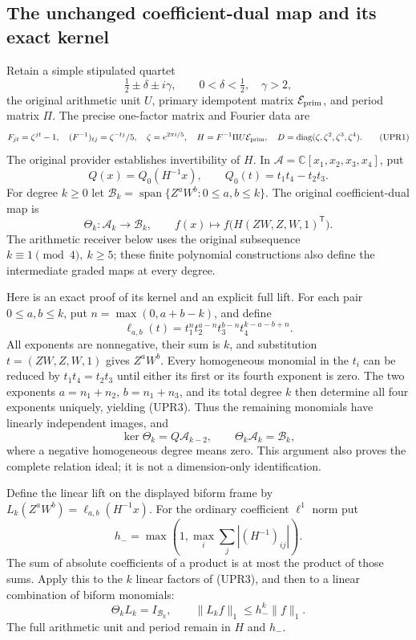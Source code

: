 \subsection{The unchanged coefficient-dual map and its exact kernel}
Retain a simple stipulated quartet
\[
\tfrac12\pm\delta\pm i\gamma,\qquad
0<\delta<\tfrac12,\quad\gamma>2,
\]
the original arithmetic unit \(U\), primary idempotent matrix
\(\mathcal E_{\rm prim}\), and period matrix \(\Pi\).  The precise
one-factor matrix and Fourier data are
\[
F_{jt}=\zeta^{jt}-1,\quad
(F^{-1})_{tj}=\zeta^{-tj}/5,\quad
\zeta=e^{2\pi i/5},\quad
H=F^{-1}\Pi U\mathcal E_{\rm prim},\quad
D=\operatorname{diag}(\zeta,\zeta^2,\zeta^3,\zeta^4).
\tag{UPR1}
\]
The original provider establishes invertibility of \(H\).  In
\(\mathcal A=\mathbb C[x_1,x_2,x_3,x_4]\), put
\[
Q(x)=Q_0(H^{-1}x),\qquad Q_0(t)=t_1t_4-t_2t_3.
\]
For degree \(k\ge0\) let
\(\mathcal B_k=\operatorname{span}\{Z^aW^b:0\le a,b\le k\}\).
The original coefficient-dual map is
\[
\Theta_k:\mathcal A_k\longrightarrow\mathcal B_k,\qquad
f(x)\longmapsto f\bigl(H(ZW,Z,W,1)^{\mathsf T}\bigr).
\tag{UPR2}
\]
The arithmetic receiver below uses the original subsequence
\(k\equiv1\pmod4,\ k\ge5\); these finite polynomial constructions
also define the intermediate graded maps at every degree.

Here is an exact proof of its kernel and an explicit full lift.
For each pair \(0\le a,b\le k\), put \(n=\max(0,a+b-k)\), and define
\[
\ell_{a,b}(t)=
t_1^nt_2^{a-n}t_3^{b-n}t_4^{k-a-b+n}.
\tag{UPR3}
\]
All exponents are nonnegative, their sum is \(k\), and substitution
\(t=(ZW,Z,W,1)\) gives \(Z^aW^b\).  Every homogeneous monomial in
the \(t_i\) can be reduced by \(t_1t_4=t_2t_3\) until either its
first or its fourth exponent is zero.  The two exponents
\(a=n_1+n_2\), \(b=n_1+n_3\), and its total degree \(k\) then
determine all four exponents uniquely, yielding (UPR3).
Thus the remaining monomials have linearly independent images, and
\[
\ker\Theta_k=Q\mathcal A_{k-2},\qquad
\Theta_k\mathcal A_k=\mathcal B_k,
\tag{UPR4}
\]
where a negative homogeneous degree means zero.  This argument
also proves the complete relation ideal; it is not a dimension-only
identification.

Define the linear lift on the displayed biform frame by
\(L_k(Z^aW^b)=\ell_{a,b}(H^{-1}x)\).
For the ordinary coefficient \(\ell^1\) norm put
\[
h_-=\max\left(1,\max_i\sum_j|(H^{-1})_{ij}|\right).
\]
The sum of absolute coefficients of a product is at most the
product of those sums.  Apply this to the \(k\) linear factors of
(UPR3), and then to a linear combination of biform monomials:
\[
\Theta_kL_k=I_{\mathcal B_k},\qquad
\|L_kf\|_1\le h_-^k\|f\|_1.
\tag{UPR5}
\]
The full arithmetic unit and period remain in \(H\) and \(h_-\).

